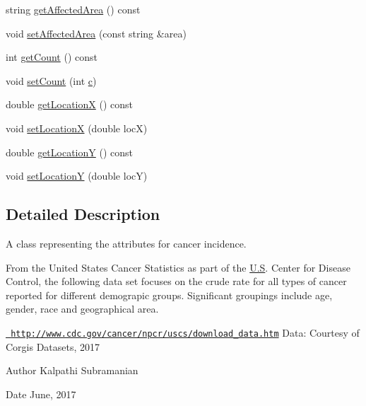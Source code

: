 \begin{DoxyCompactItemize}
string \mbox{\hyperlink{classbridges_1_1_cancer_incidence_a95c314f050d74a052f5f6e0bbe735b39}{get\+Affected\+Area}} () const
\item 
void \mbox{\hyperlink{classbridges_1_1_cancer_incidence_a4fc0d4133af2fef77b6b43c0d54f0e14}{set\+Affected\+Area}} (const string \&area)
\item 
int \mbox{\hyperlink{classbridges_1_1_cancer_incidence_a95d3f5e77f0b6e8379e8491a4f700a2d}{get\+Count}} () const
\item 
void \mbox{\hyperlink{classbridges_1_1_cancer_incidence_a5fd30ffcf94f61cbca49112332ae4e94}{set\+Count}} (int \mbox{\hyperlink{namespacebridges_acfb0a4f7877d8f63de3e6862004c50eda4a8a08f09d37b73795649038408b5f33}{c}})
\item 
double \mbox{\hyperlink{classbridges_1_1_cancer_incidence_a3e38c05364a4135319b49fec8e1ded96}{get\+LocationX}} () const
\item 
void \mbox{\hyperlink{classbridges_1_1_cancer_incidence_a6f7ec674c626e932378f01e08178d1fb}{set\+LocationX}} (double locX)
\item 
double \mbox{\hyperlink{classbridges_1_1_cancer_incidence_a6fc0c5d9a6adff2a58b16463d3fa1c52}{get\+LocationY}} () const
\item 
void \mbox{\hyperlink{classbridges_1_1_cancer_incidence_a8ca0a21c2c5153b11adf6712e6648579}{set\+LocationY}} (double locY)
\end{DoxyCompactItemize}


\subsection{Detailed Description}
A class representing the attributes for cancer incidence. 

From the United States Cancer Statistics as part of the \mbox{\hyperlink{namespacebridges_acfb0a4f7877d8f63de3e6862004c50eda5dbc98dcc983a70728bd082d1a47546e}{U.\+S}}. Center for Disease Control, the following data set focuses on the crude rate for all types of cancer reported for different demograpic groups. Significant groupings include age, gender, race and geographical area.

\href{http://www.cdc.gov/cancer/npcr/uscs/download_data.htm}{\texttt{ http\+://www.\+cdc.\+gov/cancer/npcr/uscs/download\+\_\+data.\+htm}} Data\+: Courtesy of Corgis Datasets, 2017

\begin{DoxyAuthor}{Author}
Kalpathi Subramanian 
\end{DoxyAuthor}
\begin{DoxyDate}{Date}
June, 2017 
\end{DoxyDate}



